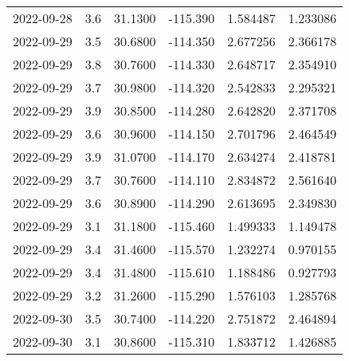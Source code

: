 \begin{tabular}{lrrrrr}
2022-09-28 &       3.6 &  31.1300 &  -115.390 &         1.584487 &         1.233086 \\
2022-09-29 &       3.5 &  30.6800 &  -114.350 &         2.677256 &         2.366178 \\
2022-09-29 &       3.8 &  30.7600 &  -114.330 &         2.648717 &         2.354910 \\
2022-09-29 &       3.7 &  30.9800 &  -114.320 &         2.542833 &         2.295321 \\
2022-09-29 &       3.9 &  30.8500 &  -114.280 &         2.642820 &         2.371708 \\
2022-09-29 &       3.6 &  30.9600 &  -114.150 &         2.701796 &         2.464549 \\
2022-09-29 &       3.9 &  31.0700 &  -114.170 &         2.634274 &         2.418781 \\
2022-09-29 &       3.7 &  30.7600 &  -114.110 &         2.834872 &         2.561640 \\
2022-09-29 &       3.6 &  30.8900 &  -114.290 &         2.613695 &         2.349830 \\
2022-09-29 &       3.1 &  31.1800 &  -115.460 &         1.499333 &         1.149478 \\
2022-09-29 &       3.4 &  31.4600 &  -115.570 &         1.232274 &         0.970155 \\
2022-09-29 &       3.4 &  31.4800 &  -115.610 &         1.188486 &         0.927793 \\
2022-09-29 &       3.2 &  31.2600 &  -115.290 &         1.576103 &         1.285768 \\
2022-09-30 &       3.5 &  30.7400 &  -114.220 &         2.751872 &         2.464894 \\
2022-09-30 &       3.1 &  30.8600 &  -115.310 &         1.833712 &         1.426885 \\
\bottomrule
\end{tabular}
